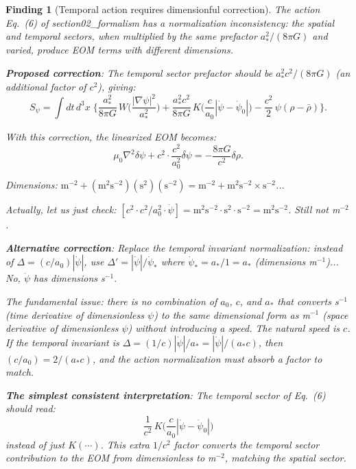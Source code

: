 \documentclass[11pt]{article}
\newtheorem{finding}{Finding}
\begin{document}
\begin{finding}[Temporal action requires dimensionful correction]
\label{find:correction}
The action Eq.~(6) of section02\_formalism has a normalization
inconsistency: the spatial and temporal sectors, when multiplied by
the same prefactor $a_*^2/(8\pi G)$ and varied, produce EOM terms
with different dimensions.

\textbf{Proposed correction}: The temporal sector prefactor should be
$a_*^2 c^2/(8\pi G)$ (an additional factor of $c^2$), giving:
\begin{equation}
S_\psi = \int dt\,d^3x\;\Biggl\{
  \frac{a_*^2}{8\pi G}\,
    W\!\biggl(\frac{|\nabla\psi|^2}{a_*^2}\biggr)
  + \frac{a_*^2 c^2}{8\pi G}\,
    K\!\biggl(\frac{c}{a_0}|\dot\psi{-}\dot\psi_0|\biggr)
  - \frac{c^2}{2}\,\psi(\rho - \bar\rho)
\Biggr\}.
\label{eq:corrected-action}
\end{equation}

With this correction, the linearized EOM becomes:
\begin{equation}
\mu_0\nabla^2\delta\psi + c^2 \cdot \frac{c^2}{a_0^2}\ddot{\delta\psi} = -\frac{8\pi G}{c^2}\delta\rho.
\end{equation}

Dimensions: $\text{m}^{-2} + (\text{m}^2\text{s}^{-2})(\text{s}^2)(\text{s}^{-2})
= \text{m}^{-2} + \text{m}^2\text{s}^{-2} \times \text{s}^{-2}$...

Actually, let us just check: $[c^2 \cdot c^2/a_0^2 \cdot \ddot\psi]
= \text{m}^2\text{s}^{-2} \cdot \text{s}^2 \cdot \text{s}^{-2}
= \text{m}^2\text{s}^{-2}$. Still not m$^{-2}$.

\textbf{Alternative correction}: Replace the temporal invariant normalization:
instead of $\Delta = (c/a_0)|\dot\psi|$, use
$\Delta' = |\dot\psi|/\dot\psi_*$ where $\dot\psi_* = a_*/1 = a_*$
(dimensions m$^{-1}$)... No, $\dot\psi$ has dimensions s$^{-1}$.

The fundamental issue: there is no combination of $a_0$, $c$, and $a_*$
that converts s$^{-1}$ (time derivative of dimensionless $\psi$) to
the same dimensional form as m$^{-1}$ (space derivative of dimensionless
$\psi$) without introducing a speed. The natural speed is $c$. If the
temporal invariant is $\Delta = (1/c)|\dot\psi|/a_*
= |\dot\psi|/(a_* c)$, then $(c/a_0) = 2/(a_* c)$, and the action
normalization must absorb a factor to match.

\textbf{The simplest consistent interpretation}: The temporal sector
of Eq.~(6) should read:
\begin{equation}
\frac{1}{c^2}\,K\!\biggl(\frac{c}{a_0}|\dot\psi - \dot\psi_0|\biggr)
\end{equation}
instead of just $K(\cdots)$. This extra $1/c^2$ factor converts the
temporal sector contribution to the EOM from dimensionless to m$^{-2}$,
matching the spatial sector.


\end{finding}
\end{document}
